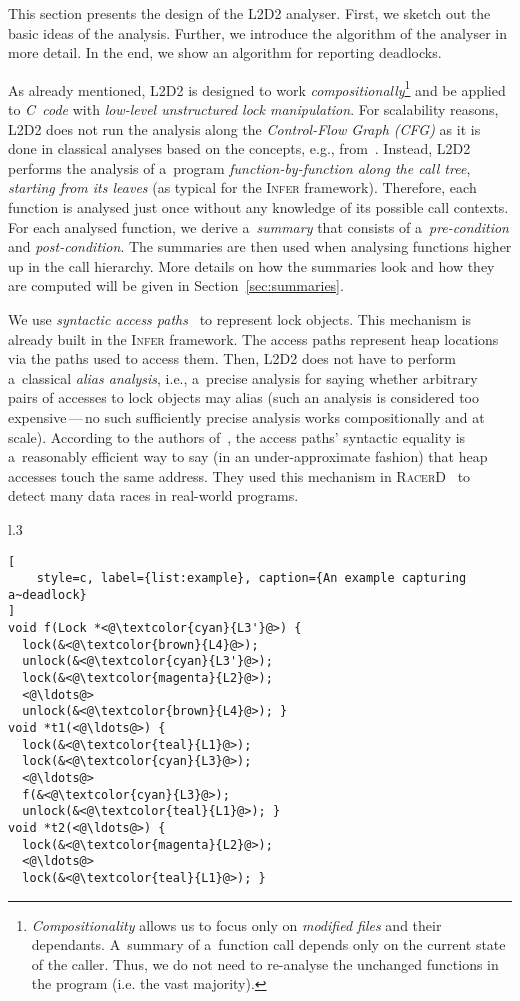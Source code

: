\documentclass[runningheads]{llncs}
\newcommand{\LLDD}{\textsc{L2D2}\xspace} %
\newcommand{\Infer}{\textsc{Infer}\xspace}
\begin{document}
This section presents the design of the \LLDD analyser. First, we
sketch out the basic ideas of the analysis. Further, we introduce the
algorithm of the analyser in more detail. In the end, we show an algorithm
for reporting deadlocks.

As already mentioned, \LLDD is designed to work
\emph{compositionally}\footnote{\emph{Compositionality} allows us to focus
only on \emph{modified files} and their dependants. A~summary of a~function
call depends only on the current state of the caller. Thus, we do not need to
re-analyse the unchanged functions in the program (i.e. the vast majority).}
and be applied to \emph{C~code} with \emph{low-level unstructured lock
manipulation}. For scalability reasons, \LLDD does not run the analysis
along the \emph{Control-Flow Graph (CFG)} as it is done in classical
analyses based on the concepts, e.g., from~\cite{dfagr95}. Instead,
\LLDD performs the analysis of a~program \emph{function-by-function along
the call tree}, \emph{starting from its leaves} (as typical for the \Infer
framework). Therefore, each function is analysed just once without any
knowledge of its possible call contexts. For each analysed function, we
derive a~\emph{summary} that consists of a~\emph{pre-condition} and
\emph{post-condition}. The summaries are then used when analysing
functions higher up in the call hierarchy. More details on how the
summaries look and how they are computed will be given in
Section~\ref{sec:summaries}.

We use \emph{syntactic access paths}~\cite{ap15} to represent lock objects.
This mechanism is already built in the \Infer framework. The access paths
represent heap locations via the paths used to access them. Then, \LLDD does not
have to perform a~classical \emph{alias analysis}, i.e., a~precise analysis for
saying whether arbitrary pairs of accesses to lock objects may alias (such an
analysis is considered too expensive\,---\,no such sufficiently precise analysis
works compositionally and at scale). According to the authors
of~\cite{racerD18}, the access paths' syntactic equality is a~reasonably
efficient way to say (in an under-approximate fashion) that heap accesses touch
the same address. They used this mechanism in \textsc{RacerD}~\cite{racerD18} to
detect many data races in real-world programs.

\begin{wrapfigure}{l}{.3 \textwidth}
\vspace*{-2em}
\begin{lstlisting}[
    style=c, label={list:example}, caption={An example capturing a~deadlock}
]
void f(Lock *<@\textcolor{cyan}{L3'}@>) {
  lock(&<@\textcolor{brown}{L4}@>);
  unlock(&<@\textcolor{cyan}{L3'}@>);
  lock(&<@\textcolor{magenta}{L2}@>);
  <@\ldots@>
  unlock(&<@\textcolor{brown}{L4}@>); }
void *t1(<@\ldots@>) {
  lock(&<@\textcolor{teal}{L1}@>);
  lock(&<@\textcolor{cyan}{L3}@>);
  <@\ldots@>
  f(&<@\textcolor{cyan}{L3}@>);
  unlock(&<@\textcolor{teal}{L1}@>); }
void *t2(<@\ldots@>) {
  lock(&<@\textcolor{magenta}{L2}@>);
  <@\ldots@>
  lock(&<@\textcolor{teal}{L1}@>); }
\end{lstlisting}
\vspace*{-2em}
\end{wrapfigure}
\end{document}
